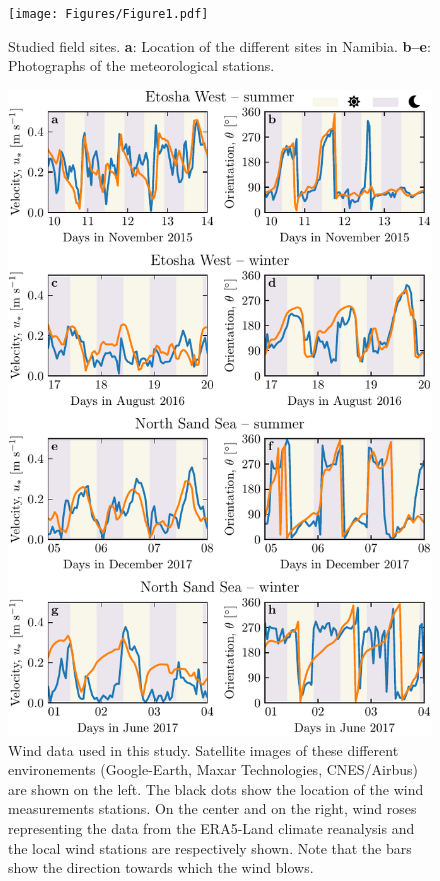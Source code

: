 \begin{figure}[t]
  \centering
  \texttt{[image: Figures/Figure1.pdf]}
  \caption{Studied field sites. \textbf{a}: Location of the different sites in Namibia. \textbf{b--e}: Photographs of the meteorological stations.}
  \label{Fig1}
\end{figure}

\begin{figure}[t]
\centering
\includegraphics[scale=1]{Figures/Figure2.pdf}
\caption{Wind data used in this study. Satellite images of these different environements (Google-Earth, Maxar Technologies, CNES/Airbus) are shown on the left. The black dots show the location of the wind measurements stations. On the center and on the right, wind roses representing the data from the ERA5-Land climate reanalysis and the local wind stations are respectively shown. Note that the bars show the direction towards which the wind blows.}
\label{Fig2}
\end{figure}


